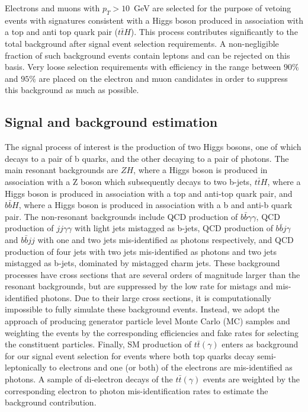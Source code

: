 Electrons and muons with $p_{T}>10$~GeV are selected for the purpose of vetoing events with signatures consistent with a Higgs boson produced in association with a top and anti top quark pair ($t\bar{t}H$). This process contributes
significantly to the total background after signal event selection requirements. A non-negligible fraction of such background events contain leptons and can be rejected on this basis. Very loose selection requirements with efficiency in the range between $90\%$ and $95\%$ are placed on the electron and muon candidates in order to suppress this background as much as possible.


\subsection{Signal and background estimation}
\label{sec:bkgestimation}
The signal process of interest is the production of two Higgs bosons, one of which decays to a pair of b quarks, 
and the other decaying to a pair of photons. The main resonant backgrounds are $ZH$, where a Higgs boson is produced in association
with a Z boson which subsequently decays to two b-jets, $t\bar{t}H$, where a Higgs boson is produced
in association with a top and anti-top quark pair, and $b\bar{b}H$, where a Higgs boson is produced in
association with a b and anti-b quark pair. The non-resonant backgrounds include QCD production 
of $b \bar{b} \gamma\gamma$, QCD production of $jj \gamma\gamma$ with light jets mistagged 
as b-jets, QCD production of $b \bar{b} j \gamma$ and $b \bar{b} jj$ with one and two
jets mis-identified as photons respectively, and QCD production of four jets with two jets mis-identified 
as photons and two jets mistagged as b-jets, dominated by mistagged charm jets. 
These background processes have cross sections that are several orders of magnitude larger than the resonant backgrounds, but are suppressed
by the low rate for mistags and mis-identified photons. Due to their large cross sections,  it is computationally impossible to fully simulate these background events. Instead, we adopt the approach of producing generator particle level Monte Carlo (MC) samples and weighting the events by the corresponding efficiencies and fake rates for selecting the constituent particles. Finally, SM  production of $t\bar{t}(\gamma)$ enters as background for our signal event selection
for events where both top quarks decay semi-leptonically to electrons and one (or both) of the electrons are mis-identified as photons. A sample of di-electron decays of the $t\bar{t}(\gamma)$ events are weighted by the corresponding electron to photon mis-identification rates to estimate the background contribution.


